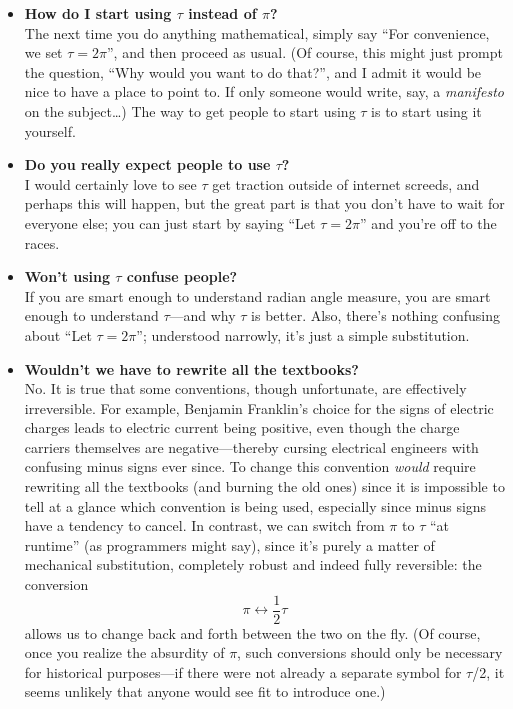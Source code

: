 \documentclass{article}
\begin{document}
\begin{itemize}
  \item \textbf{How do I start using $\tau$ instead of $\pi$?} \\ The next time you do anything mathematical, simply say ``For convenience, we set $\tau = 2\pi$'', and then proceed as usual. (Of course, this might just prompt the question, ``Why would you want to do that?'', and I admit it would be nice to have a place to point to. If only someone would write, say, a \emph{manifesto} on the subject\ldots) The way to get people to start using $\tau$ is to start using it yourself. 

  \item \textbf{Do you really expect people to use $\tau$?} \\ I would certainly love to see $\tau$ get traction outside of internet screeds, and perhaps this will happen, but the great part is that you don't have to wait for everyone else; you can just start by saying ``Let $\tau = 2\pi$'' and you're off to the races. 
  
  \item \textbf{Won't using $\tau$ confuse people?} \\ If you are smart enough to understand radian angle measure, you are smart enough to understand $\tau$---and why $\tau$ is better. Also, there's nothing confusing about ``Let $\tau = 2\pi$''; understood narrowly, it's just a simple substitution.
  \item \textbf{Wouldn't we have to rewrite all the textbooks?} \\ No. It is true that some conventions, though unfortunate, are effectively irreversible. For example, Benjamin Franklin's choice for the signs of electric charges leads to electric current being positive, even though the charge carriers themselves are negative---thereby cursing electrical engineers with confusing minus signs ever since. To change this convention \emph{would} require rewriting all the textbooks (and burning the old ones) since it is impossible to tell at a glance which convention is being used, especially since minus signs have a tendency to cancel. In contrast, we can switch from $\pi$ to $\tau$ ``at runtime'' (as programmers might say), since it's purely a matter of mechanical substitution, completely robust and indeed fully reversible: the conversion \[ \pi \leftrightarrow \textstyle{\frac{1}{2}}\tau \] allows us to change back and forth between the two on the fly. (Of course, once you realize the absurdity of $\pi$, such conversions should only be necessary for historical purposes---if there were not already a separate symbol for $\tau$/2, it seems unlikely that anyone would see fit to introduce one.)
  

\end{itemize}
\end{document}

